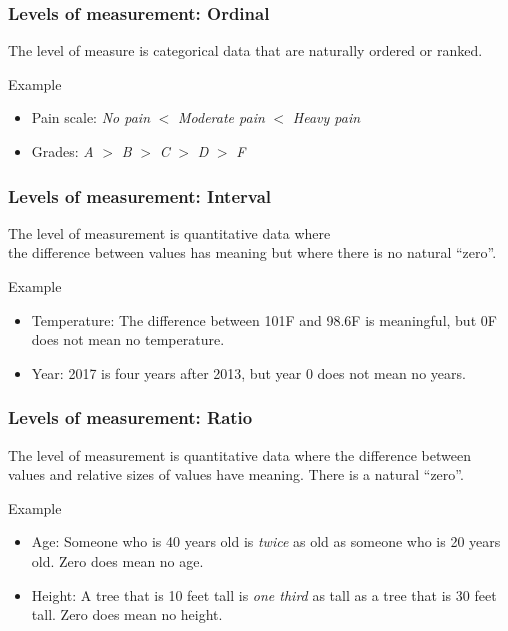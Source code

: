 \documentclass[xcolor=table, aspectratio=169, bigger, handout]{beamer}
\begin{document}
\begin{frame}
\frametitle{Levels of measurement: Ordinal}
\begin{block}{}
The  level of measure is categorical data that are naturally ordered or ranked.
\end{block}
\pause
\begin{exampleblock}{Example}
\begin{itemize}
\item Pain scale: \emph{No pain} $<$ \emph{Moderate pain} $<$ \emph{Heavy pain}
\item Grades: \emph A $>$ \emph B $>$ \emph C $>$ \emph D $>$ \emph F
\end{itemize}
\end{exampleblock}
\end{frame}

\begin{frame}
\frametitle{Levels of measurement: Interval}
\begin{block}{}
The  level of measurement is quantitative data where\\ the difference between values has meaning but where there is no natural ``zero''.
\end{block}
\pause
\begin{exampleblock}{Example}
\begin{itemize}
\item Temperature: The difference between 101\textdegree F and 98.6\textdegree F is meaningful, but 0\textdegree F does not mean no temperature.
\item Year: 2017 is four years after 2013, but year 0 does not mean no years.
\end{itemize}
\end{exampleblock}
\end{frame}

\begin{frame}
\frametitle{Levels of measurement: Ratio}
\begin{block}{}
The  level of measurement is quantitative data where the difference between values and relative sizes of values have meaning. There is a natural ``zero''.
\end{block}
\pause
\begin{exampleblock}{Example}
\begin{itemize}
\item Age: Someone who is 40 years old is \emph{twice} as old as someone who is 20 years old. Zero does mean no age.

\item Height: A tree that is 10 feet tall is \emph{one third} as tall as a tree that is 30 feet tall. Zero does mean no height.
\end{itemize}

\end{exampleblock}
\end{frame}
\end{document}

